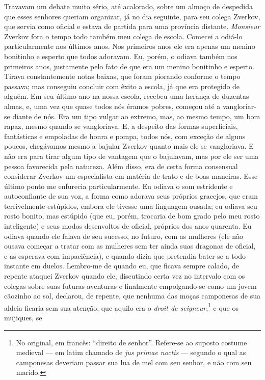 Travavam um debate muito sério, até acalorado, sobre um almoço de despedida que
esses senhores queriam organizar, já no dia seguinte, para seu colega Zverkov,
que servia como oficial e estava de partida para uma província distante.
\textit{Monsieur} Zverkov fora o tempo todo também meu colega de escola.
Comecei a odiá-lo particularmente nos últimos anos. Nos primeiros anos ele era
apenas um menino bonitinho e esperto que todos adoravam. Eu, porém, o odiava
também nos primeiros anos, justamente pelo fato de que era um menino bonitinho
e esperto.  Tirava constantemente notas baixas, que foram piorando conforme o
tempo passava; mas conseguiu concluir com êxito a escola, já que era protegido
de alguém. Em seu último ano na nossa escola, recebeu uma herança de duzentas
almas, e, uma vez que quase todos nós éramos pobres, começou até a
vangloriar-se diante de nós. Era um tipo vulgar ao extremo, mas, ao mesmo
tempo, um bom rapaz, mesmo quando se vangloriava. E, a despeito das formas
superficiais, fantásticas e empoladas de honra e pompa, todos nós, com exceção
de alguns poucos, chegávamos mesmo a bajular Zverkov quanto mais ele se
vangloriava. E não era para tirar algum tipo de vantagem que o bajulavam, mas
por ele ser uma pessoa favorecida pela natureza. Além disso, era de certa forma
consensual considerar Zverkov um especialista em matéria de trato e de boas
maneiras. Esse último ponto me enfurecia particularmente. Eu odiava o som
estridente e autoconfiante de sua voz, a forma como adorava seus próprios
gracejos, que eram terrivelmente estúpidos, embora ele tivesse uma linguagem
ousada; eu odiava seu rosto bonito, mas estúpido (que eu, porém, trocaria de
bom grado pelo meu rosto inteligente) e seus modos desenvoltos de oficial,
próprios dos anos quarenta. Eu odiava quando ele falava de seu sucesso, no
futuro, com as mulheres (ele não ousava começar a tratar com as mulheres sem
ter ainda suas dragonas de oficial, e as esperava com impaciência), e quando
dizia que pretendia bater-se a todo instante em duelos. Lembro-me de quando eu,
que ficava sempre calado, de repente ataquei Zverkov quando ele, discutindo
certa vez no intervalo com os colegas sobre suas futuras aventuras e finalmente
empolgando-se como um jovem cãozinho ao sol, declarou, de repente, que nenhuma
das moças camponesas de sua aldeia ficaria sem sua atenção, que aquilo era o
\textit{droit de seigneur},\footnote{ No original, em francês: “direito de
senhor”. Refere-se ao suposto costume medieval --- em latim chamado de
\textit{jus primae noctis} --- segundo o qual as camponesas deveriam passar sua
lua de mel com seu senhor, e não com seu marido.} e que os mujiques, se
